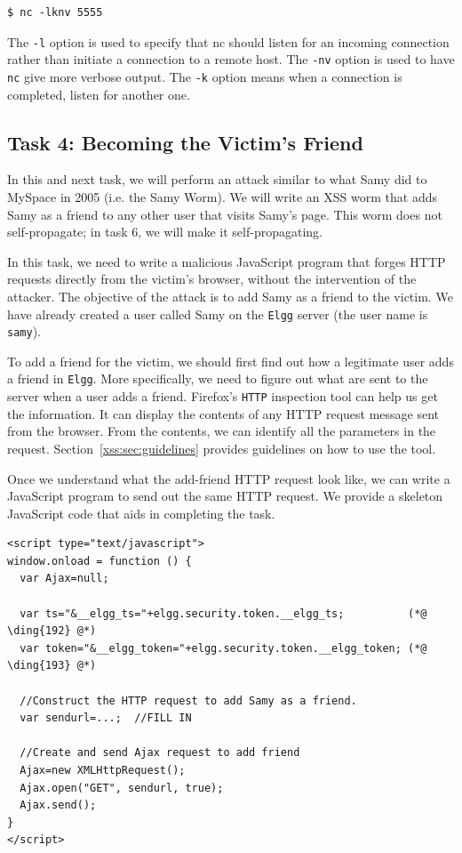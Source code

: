\begin{lstlisting}
$ nc -lknv 5555 
\end{lstlisting}

\noindent The \texttt{-l} option is used to specify that nc should listen for an incoming
connection rather than initiate a connection to a remote host. The \texttt{-nv} option is used to
have \texttt{nc} give more verbose output. The \texttt{-k} option means when a connection
is completed, listen for another one.


\subsection{Task 4: Becoming the Victim's Friend}

In this and next task, we will perform an attack similar to what Samy did to MySpace in 2005
(i.e. the Samy Worm). We will write an XSS worm that adds Samy as a friend to any other user
that visits Samy's page. This worm does not self-propagate; in task 6, we will make it
self-propagating.

In this task, we need to write a malicious JavaScript program that forges HTTP requests
directly from the victim's browser, without the intervention of the attacker. The objective of
the attack is to add Samy as a friend to the victim. We have already created a user called Samy
on the {\tt Elgg} server (the user name is {\tt samy}).


To add a friend for the victim, we should first find out how a legitimate 
user adds a friend in {\tt Elgg}.
More specifically, we need to figure out what are sent to the server when a user 
adds a friend. Firefox's \texttt{HTTP} inspection tool 
can help us get the information. It can display the contents of any HTTP request message sent 
from the browser. From the contents, we can identify all
the parameters in the request. Section~\ref{xss:sec:guidelines}
provides guidelines on how to use the tool.


Once we understand what the add-friend HTTP request look like, 
we can write a JavaScript program to send out the same HTTP request. We provide a skeleton
JavaScript code that aids in completing the task.

\begin{lstlisting}
<script type="text/javascript">
window.onload = function () {
  var Ajax=null;

  var ts="&__elgg_ts="+elgg.security.token.__elgg_ts;          (*@ \ding{192} @*)
  var token="&__elgg_token="+elgg.security.token.__elgg_token; (*@ \ding{193} @*)

  //Construct the HTTP request to add Samy as a friend.
  var sendurl=...;  //FILL IN

  //Create and send Ajax request to add friend
  Ajax=new XMLHttpRequest();
  Ajax.open("GET", sendurl, true);
  Ajax.send();
} 
</script>
\end{lstlisting}


